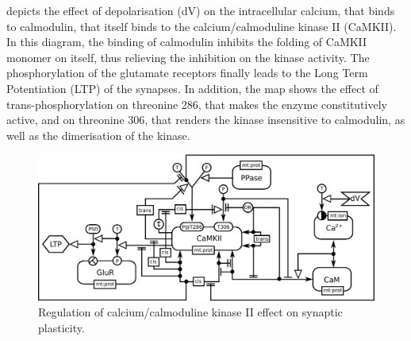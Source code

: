  depicts the effect of depolarisation (dV) on the intracellular calcium, that binds to calmodulin, that itself binds to the calcium/calmoduline kinase II (CaMKII). In this diagram, the binding of calmodulin inhibits the folding of CaMKII monomer on itself, thus relieving the inhibition on the kinase activity. The phosphorylation of the glutamate receptors finally leads to the Long Term Potentiation (LTP) of the synapses. In addition, the map shows the effect of trans-phosphorylation on threonine 286, that makes the enzyme constitutively active, and on threonine 306, that renders the kinase insensitive to calmodulin, as well as the dimerisation of the kinase.

\begin{figure}[H]
  \centering
  \vspace*{-0.75em}
  \includegraphics[scale=0.45]{examples/CaMKII-intro}
   \caption{Regulation of calcium/calmoduline kinase II effect on synaptic plasticity.}
  \label{fig:CaMKII}
\end{figure}

